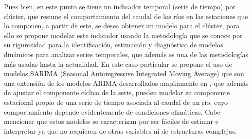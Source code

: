 \documentclass[12pt,oneside]{book}\usepackage[]{graphicx}\usepackage[]{color}
\theoremstyle{definition} %
\begin{document}
Pues bien, en este punto se tiene un indicador temporal (serie de tiempo) por clúster, que resume el comportamiento del caudal de los ríos en las estaciones que lo componen, a partir de este, se desea obtener un modelo para el clúster, para ello se propone modelar este indicador usando la metodología \citeauthor{box1970time} \citeyear{box1970time} que se conoce por su rigurosidad para la identificación, estimación y diagnóstico de modelos dinámicos para analizar series temporales, que además es una de las metodologías más usadas hasta la actualidad.
En este caso particular se propone el uso de modelos SARIMA (Seasonal Autoregressive Integrated Moving Average) que son una extensión de los modelos ARIMA desarrollados ampliamente en \citeauthor{box2015time} \citeyear{box2015time}, que además de ajustar el componente cíclico de la serie, pueden modelar su componente estacional propio de una serie de tiempo asociada al caudal de un río, cuyo comportamiento depende evidentemente de condiciones climáticas. Cabe mencionar que estos modelos se caracterizan por ser fáciles de estimar e interpretar ya que no requieren de otras variables ni de estructuras complejas.

%


\end{document}
